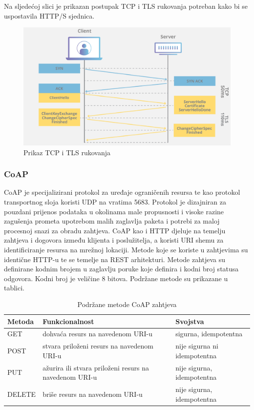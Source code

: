 \documentclass[times, utf8, diplomski]{fer}
\begin{document}
Na sljedećoj slici je prikazan postupak TCP i TLS rukovanja potreban kako bi se uspostavila HTTP/S sjednica.
\begin{figure}[htb]
    \centering
    \includegraphics[width=14.5cm]{images/tls.png}
    \caption{Prikaz TCP i TLS rukovanja\citep{TLS}}
    \label{fig:tls}
\end{figure}

\subsubsection{CoAP}
CoAP \citep{COAP} je specijalizirani protokol za uređaje ograničenih resursa te kao protokol transportnog sloja koristi UDP na vratima 5683. Protokol je dizajniran za pouzdani prijenos podataka u okolinama male propusnosti i visoke razine zagušenja prometa upotrebom malih zaglavlja paketa i potrebi za maloj procesnoj snazi za obradu zahtjeva. CoAP kao i HTTP djeluje na temelju zahtjeva i dogovora između klijenta i poslužitelja, a koristi URI shemu za identificiranje resursa na mrežnoj lokaciji. Metode koje se koriste u zahtjevima su identične HTTP-u te se temelje na REST  arhitekturi. Metode zahtjeva su definirane kodnim brojem u zaglavlju poruke koje definira i kodni broj statusa odgovora. Kodni broj je veličine 8 bitova. Podržane metode su prikazane u tablici.
\begin{table}[H]
    \centering
    \caption{Podržane metode CoAP zahtjeva}
    \begin{tabular}{| L | L | M |} 
    \hline
    \textbf{Metoda} & \textbf{Funkcionalnost} & \textbf{Svojstva}\\
    \hline\hline
    GET & dohvaća resurs na navedenom URI-u & sigurna, idempotentna \\
    \hline
    POST & stvara priloženi resurs na navedenom URI-u & nije sigurna ni idempotentna \\ 
    \hline
    PUT & ažurira ili stvara priloženi resurs na navedenom URI-u & nije sigurna, idempotentna \\ 
    \hline
    DELETE & briše resurs na navedenom URI-u & nije sigurna, idempotentna \\ 
    \hline
    \end{tabular}
    \label{tab:coap}
\end{table} 
\end{document}
